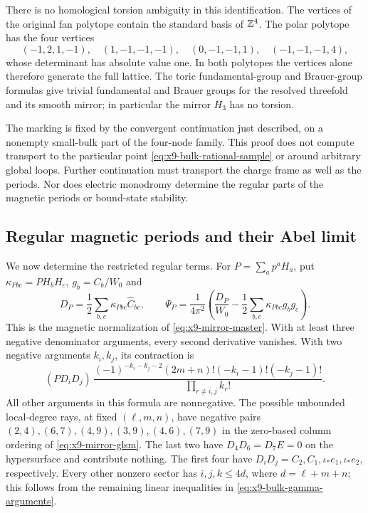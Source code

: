 There is no homological torsion ambiguity in this identification.
The vertices of the original fan polytope contain the standard
basis of $\mathbb Z^4$. The polar polytope has the four vertices
\begin{equation}
 (-1,2,1,-1),\quad(1,-1,-1,-1),\quad
 (0,-1,-1,1),\quad(-1,-1,-1,4),
 \label{eq:x9-bulk-polar-lattice}
\end{equation}
whose determinant has absolute value one. In both polytopes the
vertices alone therefore generate the full lattice. The toric
fundamental-group and Brauer-group formulas
\cite[Corollaries~1.9 and~3.9]{Batyrev:2005Integral}
give trivial fundamental and Brauer groups for the resolved
threefold and its smooth mirror; in particular the mirror
$H_3$ has no torsion.

The marking is fixed by the convergent continuation just described,
on a nonempty small-bulk part of the four-node family. This proof
does not compute transport to the particular point
\eqref{eq:x9-bulk-rational-sample} or around arbitrary global
loops. Further continuation must transport the charge frame as
well as the periods. Nor does electric monodromy determine the
regular parts of the magnetic periods or bound-state stability.

\subsection{Regular magnetic periods and their Abel limit}
We now determine the restricted regular terms. For $P=\sum_a p^aH_a$,
put $\kappa_{Pbc}=PH_bH_c$, $g_b=C_b/W_0$ and
\begin{equation}
 D_P=\frac12\sum_{b,c}\kappa_{Pbc}\widehat C_{bc},\qquad
 \Psi_P=\frac1{4\pi^2}
       \left(\frac{D_P}{W_0}
                    -\frac12\sum_{b,c}\kappa_{Pbc}g_bg_c\right).
 \label{eq:x9-endpoint-magnetic-master}
\end{equation}
This is the magnetic normalization of \eqref{eq:x9-mirror-master}. With at least three
negative denominator arguments, every second derivative vanishes.
With two negative arguments $k_i,k_j$, its contraction is
\begin{equation}
 (PD_iD_j)\,
 \frac{(-1)^{-k_i-k_j-2}(2m+n)!(-k_i-1)!(-k_j-1)!}
      {\prod_{r\neq i,j} k_r!}.
 \label{eq:x9-two-zero-magnetic-coefficient}
\end{equation}
All other arguments in this formula are nonnegative. The possible
unbounded local-degree rays, at fixed $(\ell,m,n)$, have negative
pairs $(2,4),(6,7),(4,9),(3,9),(4,6),(7,9)$ in the zero-based
column ordering of \eqref{eq:x9-mirror-glsm}. The last two have
$D_4D_6=D_7E=0$ on the hypersurface and contribute nothing.
The first four have $D_iD_j=C_2,C_1,\iota_*e_1,\iota_*e_2$,
respectively. Every other nonzero sector has $i,j,k\leq4d$,
where $d=\ell+m+n$; this follows from the remaining linear
inequalities in \eqref{eq:x9-bulk-gamma-arguments}.

